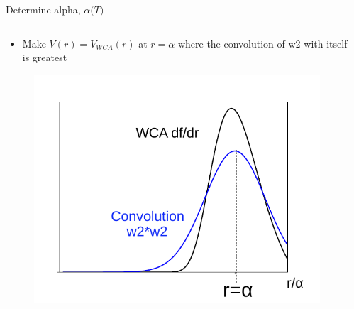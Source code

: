 \documentclass{beamer}
\begin{document}
\begin{frame}{Determine alpha, $\alpha{(}T)$}
	\begin{columns}[t]
	    \vspace{-0.5em}
		\begin{block}{}
			\begin{itemize}
			    \item Make $V(r)=V_{WCA}(r)$ at $r=\alpha$ where 
			    the convolution of w2 with itself is greatest
			\end{itemize}
			    \begin{figure}
            \centering
            \includegraphics[width=.9\columnwidth]{figs/df_dr_with_xi_fromB2_pic.pdf}
          \end{figure}
		\end{block}	  
		\column{.55\textwidth}
        \vspace{-0.5em}
        \begin{block}{}
        \begin{itemize}

\end{itemize}
\end{block}
\end{columns}
\end{frame}
\end{document}
